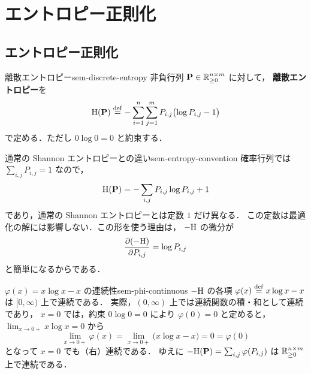\chapter{エントロピー正則化}
\label{ch:seminar-03-entropic}

\section{エントロピー正則化}
\label{sec:sem-entropic-regularization}

\begin{definition}{離散エントロピー}{sem-discrete-entropy}
  非負行列 $\mathbf{P} \in \mathbb{R}_{\geq 0}^{n \times m}$ に対して，
  \textbf{離散エントロピー}を
  \[
    \mathrm{H}(\mathbf{P})
    \overset{\mathrm{def}}{=}
    - \sum_{i=1}^{n} \sum_{j=1}^{m}
      P_{i,j}\bigl(\log P_{i,j} - 1\bigr)
  \]
  で定める．ただし $0\log 0 = 0$ と約束する．
\end{definition}

\begin{remark}{通常の Shannon エントロピーとの違い}{sem-entropy-convention}
  確率行列では $\sum_{i,j}P_{i,j}=1$ なので，
  \[
    \mathrm{H}(\mathbf{P})
    =
    -\sum_{i,j} P_{i,j}\log P_{i,j} + 1
  \]
  であり，通常の Shannon エントロピーとは定数 $1$ だけ異なる．
  この定数は最適化の解には影響しない．この形を使う理由は，
  $-\mathrm{H}$ の微分が
  \[
    \frac{\partial(-\mathrm{H})}{\partial P_{i,j}} = \log P_{i,j}
  \]
  と簡単になるからである．
\end{remark}

\begin{remark}{$\varphi(x)=x\log x-x$ の連続性}{sem-phi-continuous}
  $-\mathrm{H}$ の各項 $\varphi(x) \overset{\mathrm{def}}{=} x\log x - x$ は $[0,\infty)$ 上で連続である．
  実際，$(0,\infty)$ 上では連続関数の積・和として連続であり，
  $x = 0$ では，約束 $0\log 0 = 0$ により $\varphi(0) = 0$ と定めると，
  $\lim_{x\to0+} x\log x = 0$ から
  \[
    \lim_{x \to 0+} \varphi(x)
    = \lim_{x \to 0+}\bigl(x\log x - x\bigr) = 0 = \varphi(0)
  \]
  となって $x = 0$ でも（右）連続である．
  ゆえに $-\mathrm{H}(\mathbf{P}) = \sum_{i,j}\varphi(P_{i,j})$ は
  $\mathbb{R}_{\geq 0}^{n\times m}$ 上で連続である．
\end{remark}

